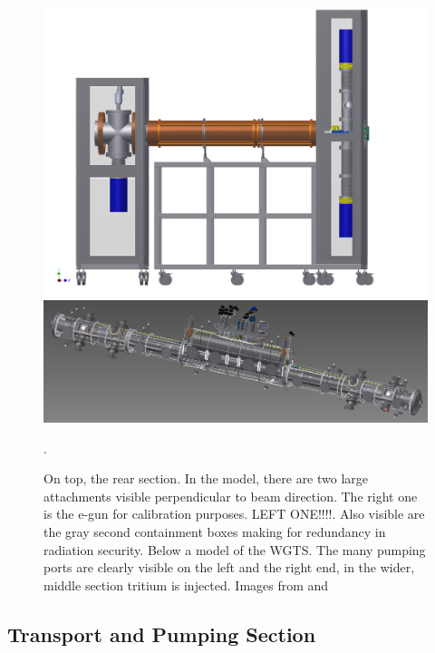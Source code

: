      \begin{figure}
     \centering
		\begin{minipage}{0.6\textwidth}
				\includegraphics[width = 1.0\textwidth]{graphics/katrinExperiment/rearSectionFull1.png}
		\end{minipage}
		\begin{minipage}{\textwidth}
			\includegraphics[width = 1.0\textwidth]{graphics/katrinExperiment/WGTS.jpg}
		\end{minipage}
		\caption[Rear section and WGTS]{On top, the rear section. In the model, there are two large attachments visible perpendicular to beam direction. The right one is the e-gun for calibration purposes. LEFT ONE!!!!. Also visible are the gray second containment boxes making for redundancy in radiation security. Below a model of the WGTS. The many pumping ports are clearly visible on the left and the right end, in the wider, middle section tritium is injected. Images from \cite{rearSection} and \cite{WGTSDrexlin}}.
		\label{fig:sourceSide}
      \end{figure}
      
      
      \subsection{Transport and Pumping Section}
      
